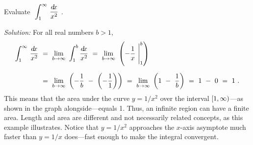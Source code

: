 \begin{exmp}\label{exmp:improper2}
\noindent Evaluate $~\displaystyle\int_1^{\infty}\,\dfrac{d\!x}{x^2}~$.\vspace{1mm}
\par\noindent\emph{Solution:} For all real numbers $b > 1$,
\begin{align*}
\int_1^{\infty}\,\dfrac{d\!x}{x^2} ~&=~ \lim_{b \to \infty}~\int_{1}^{b} \dfrac{d\!x}{x^2} ~=~
\lim_{b \to \infty}~\left(-\frac{1}{x}~\Biggr|_1^{b}\right)\\[6pt]
&=~ \lim_{b \to \infty}~ \left(-\frac{1}{b} ~-~ \left(-\frac{1}{1}\right)\right) ~=~
    \lim_{b \to \infty}~ \left(1 ~-~ \frac{1}{b}\right) ~=~ 1 ~-~ 0 ~=~ 1 ~.
\end{align*}\vspace{-10mm}
\noindent This means that the area under the curve $y=1/x^2$ over the interval
$\lbrack 1,\infty )$---as shown in the graph alongside---equals 1. Thus, an infinite
region can have a finite area. Length and area are different and not necessarily
related concepts, as this example illustrates. Notice that $y=1/x^2$ approaches
the $x$-axis asymptote much faster than $y=1/x$ does---fast enough to make the
integral convergent.
\end{exmp}
